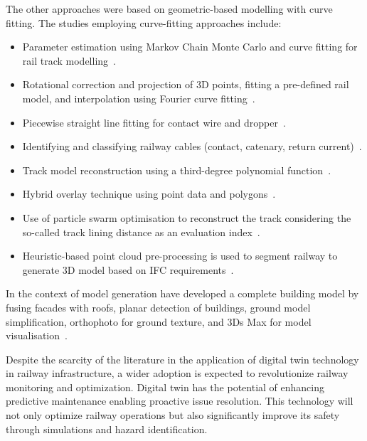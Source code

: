The other approaches were based on geometric-based modelling with curve fitting. The studies employing curve-fitting approaches include:  
\begin{itemize}
    \item Parameter estimation using Markov Chain Monte Carlo and curve fitting for rail track modelling~\cite{oudeelberink2013rail}.
    \item Rotational correction and projection of 3D points, fitting a pre-defined rail model, and interpolation using Fourier curve fitting~\cite{sahebdivani2020rail}.
    \item Piecewise straight line fitting for contact wire and dropper~\cite{xu2021vehicle-born}.
    \item Identifying and classifying railway cables (contact, catenary, return current)~\cite{chen2021railway}.
    \item Track model reconstruction using a third-degree polynomial function~\cite{jwa2015kalman}.
    \item Hybrid overlay technique using point data and polygons~\cite{kwoczynska2016elaboration}.
    \item Use of particle swarm optimisation to reconstruct the track considering the so-called track lining distance as an evaluation index~\cite{li2018methodology}.
    \item Heuristic-based point cloud pre-processing is used to segment railway to generate 3D model based on IFC requirements~\cite{soilan2021fully}. 
\end{itemize}
In the context of model generation \citeauthor{zhu2014the} have developed a complete building model by fusing facades with roofs, planar detection of buildings, ground model simplification, orthophoto for ground texture, and 3Ds Max for model visualisation~\cite{zhu2014the}.

Despite the scarcity of the literature in the application of digital twin technology in railway infrastructure, a wider adoption is expected to revolutionize railway monitoring and optimization. Digital twin has the potential of enhancing predictive maintenance enabling proactive issue resolution. This technology will not only optimize railway operations but also significantly improve its safety through simulations and hazard identification. 